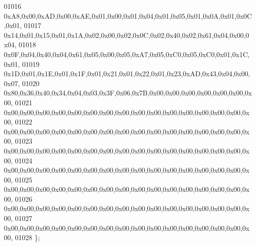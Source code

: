 \begin{DoxyCode}
01016 0xA8,0x00,0xAD,0x00,0xAE,0x01,0x00,0x01,0x04,0x01,0x05,0x01,0x0A,0x01,0x0C,0x01,
01017 0x14,0x01,0x15,0x01,0x1A,0x02,0x00,0x02,0x0C,0x02,0x40,0x02,0x61,0x04,0x00,0x04,
01018 0x0F,0x04,0x40,0x04,0x61,0x05,0x00,0x05,0xA7,0x05,0xC0,0x05,0xC0,0x01,0x1C,0x01,
01019 0x1D,0x01,0x1E,0x01,0x1F,0x01,0x21,0x01,0x22,0x01,0x23,0xAD,0x43,0x04,0x00,0x07,
01020 0x80,0x36,0x40,0x34,0x04,0x03,0x3F,0x06,0x7B,0x00,0x00,0x00,0x00,0x00,0x00,0x00,
01021 0x00,0x00,0x00,0x00,0x00,0x00,0x00,0x00,0x00,0x00,0x00,0x00,0x00,0x00,0x00,0x00,
01022 0x00,0x00,0x00,0x00,0x00,0x00,0x00,0x00,0x00,0x00,0x00,0x00,0x00,0x00,0x00,0x00,
01023 0x00,0x00,0x00,0x00,0x00,0x00,0x00,0x00,0x00,0x00,0x00,0x00,0x00,0x00,0x00,0x00,
01024 0x00,0x00,0x00,0x00,0x00,0x00,0x00,0x00,0x00,0x00,0x00,0x00,0x00,0x00,0x00,0x00,
01025 0x00,0x00,0x00,0x00,0x00,0x00,0x00,0x00,0x00,0x00,0x00,0x00,0x00,0x00,0x00,0x00,
01026 0x00,0x00,0x00,0x00,0x00,0x00,0x00,0x00,0x00,0x00,0x00,0x00,0x00,0x00,0x00,0x00,
01027 0x00,0x00,0x00,0x00,0x00,0x00,0x00,0x00,0x00,0x00,0x00,0x00,0x00,0x00,0x00,0x00,
01028 \};
\end{DoxyCode}
